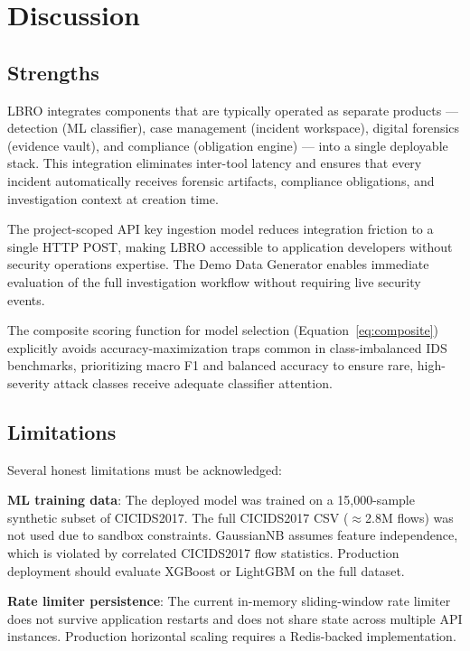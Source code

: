 \documentclass[conference]{IEEEtran}
\begin{document}
\section{Discussion}

\subsection{Strengths}

LBRO integrates components that are typically operated as separate products — detection (ML classifier), case management (incident workspace), digital forensics (evidence vault), and compliance (obligation engine) — into a single deployable stack. This integration eliminates inter-tool latency and ensures that every incident automatically receives forensic artifacts, compliance obligations, and investigation context at creation time.

The project-scoped API key ingestion model reduces integration friction to a single HTTP POST, making LBRO accessible to application developers without security operations expertise. The Demo Data Generator enables immediate evaluation of the full investigation workflow without requiring live security events.

The composite scoring function for model selection (Equation~\ref{eq:composite}) explicitly avoids accuracy-maximization traps common in class-imbalanced IDS benchmarks, prioritizing macro F1 and balanced accuracy to ensure rare, high-severity attack classes receive adequate classifier attention.

\subsection{Limitations}

Several honest limitations must be acknowledged:

\textbf{ML training data}: The deployed model was trained on a 15,000-sample synthetic subset of CICIDS2017. The full CICIDS2017 CSV ($\approx$2.8M flows) was not used due to sandbox constraints. GaussianNB assumes feature independence, which is violated by correlated CICIDS2017 flow statistics. Production deployment should evaluate XGBoost or LightGBM on the full dataset.

\textbf{Rate limiter persistence}: The current in-memory sliding-window rate limiter does not survive application restarts and does not share state across multiple API instances. Production horizontal scaling requires a Redis-backed implementation.
\end{document}
